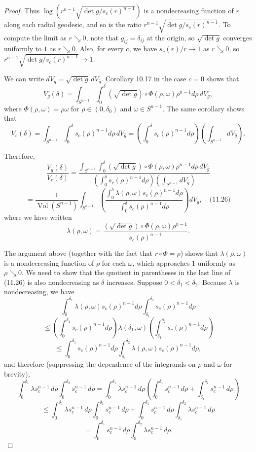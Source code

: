 \begin{theorem}
\begin{proof}
Thus $\log(r^{n-1}\sqrt{\det g/s_c(r)^{n-1}})$ is a nondecreasing function of $r$ along each radial geodesic, and so is the ratio $r^{n-1}\sqrt{\det g/s_c(r)^{n-1}}$. To compute the limit as $r \searrow 0$, note that $g_{ij} = \delta_{ij}$ at the origin, so $\sqrt{\det g}$ converges uniformly to $1$ as $r \searrow 0$. Also, for every $c$, we have $s_c(r)/r \to 1$ as $r \searrow 0$, so $r^{n-1}\sqrt{\det g/s_c(r)^{n-1}} \to 1$.

We can write $dV_g = \sqrt{\det g}\, dV_{\bar{g}}$. Corollary 10.17 in the case $c=0$ shows that
\[
V_g(\delta) = \int_{S^{n-1}} \int_0^\delta (\sqrt{\det g}) \circ \Phi(\rho,\omega) \rho^{n-1} d\rho\, dV_{\bar{g}},
\]
where $\Phi(\rho,\omega) = \rho\omega$ for $\rho \in (0,\delta_0)$ and $\omega \in S^{n-1}$. The same corollary shows that
\[
V_c(\delta) = \int_{S^{n-1}} \int_0^\delta s_c(\rho)^{n-1} d\rho\, dV_{\bar{g}} = \left(\int_0^\delta s_c(\rho)^{n-1} d\rho\right) \left(\int_{S^{n-1}} dV_{\bar{g}}\right).
\]

Therefore,
\[
\frac{V_g(\delta)}{V_c(\delta)} = \frac{\int_{S^{n-1}} \int_0^\delta (\sqrt{\det g}) \circ \Phi(\rho,\omega) \rho^{n-1} d\rho\, dV_{\bar{g}}}{\left(\int_0^\delta s_c(\rho)^{n-1} d\rho\right) \left(\int_{S^{n-1}} dV_{\bar{g}}\right)}
\]
\[
= \frac{1}{\operatorname{Vol}(S^{n-1})} \int_{S^{n-1}} \left(\frac{\int_0^\delta \lambda(\rho,\omega) s_c(\rho)^{n-1} d\rho}{\int_0^\delta s_c(\rho)^{n-1} d\rho}\right) dV_{\bar{g}}, \quad \text{(11.26)}
\]
where we have written
\[
\lambda(\rho,\omega) = \frac{(\sqrt{\det g}) \circ \Phi(\rho,\omega) \rho^{n-1}}{s_c(\rho)^{n-1}}.
\]

The argument above (together with the fact that $r \circ \Phi = \rho$) shows that $\lambda(\rho,\omega)$ is a nondecreasing function of $\rho$ for each $\omega$, which approaches $1$ uniformly as $\rho \searrow 0$. We need to show that the quotient in parentheses in the last line of (11.26) is also nondecreasing as $\delta$ increases. Suppose $0 < \delta_1 < \delta_2$. Because $\lambda$ is nondecreasing, we have
\[
\int_0^{\delta_1} \lambda(\rho,\omega) s_c(\rho)^{n-1} d\rho \int_{\delta_1}^{\delta_2} s_c(\rho)^{n-1} d\rho
\]
\[
\le \left(\int_0^{\delta_1} s_c(\rho)^{n-1} d\rho\right) \lambda(\delta_1,\omega) \left(\int_{\delta_1}^{\delta_2} s_c(\rho)^{n-1} d\rho\right)
\]
\[
\le \int_0^{\delta_1} s_c(\rho)^{n-1} d\rho \int_{\delta_1}^{\delta_2} \lambda(\rho,\omega) s_c(\rho)^{n-1} d\rho,
\]
and therefore (suppressing the dependence of the integrands on $\rho$ and $\omega$ for brevity),
\[
\int_0^{\delta_1} \lambda s_c^{n-1}\, d\rho \int_0^{\delta_2} s_c^{n-1}\, d\rho
= \int_0^{\delta_1} \lambda s_c^{n-1}\, d\rho \left(\int_0^{\delta_1} s_c^{n-1}\, d\rho + \int_{\delta_1}^{\delta_2} s_c^{n-1}\, d\rho\right)
\]
\[
\le \int_0^{\delta_1} \lambda s_c^{n-1}\, d\rho \int_0^{\delta_1} s_c^{n-1}\, d\rho + \int_0^{\delta_1} s_c^{n-1}\, d\rho \int_{\delta_1}^{\delta_2} \lambda s_c^{n-1}\, d\rho
\]
\[
= \int_0^{\delta_1} s_c^{n-1}\, d\rho \int_0^{\delta_2} \lambda s_c^{n-1}\, d\rho.
\]


\end{proof}
\end{theorem}
